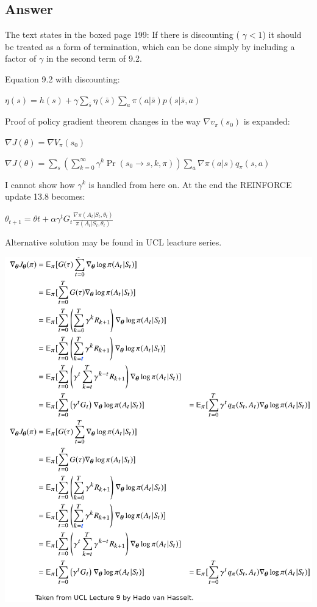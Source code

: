 \documentclass[11pt]{article}
\begin{document}
    \subsection*{Answer}

    \noindent The text states in the boxed page 199: If there is discounting ( $\gamma < 1 $) it should be treated as a form of termination, which can be done simply by including a factor of $\gamma$ in the second term of 9.2.

    \noindent Equation 9.2 with discounting:

    \noindent $ \eta(s) = h(s) + \gamma \sum_{\bar{s}} \eta(\bar{s}) \sum_{a} \pi(a|\bar{s}) p(s| \bar{s},a)  $

    \hfill \break
    \noindent Proof of policy gradient theorem changes in the way $ \nabla v_{\pi}(s_0) $ is expanded:

    \noindent $ \nabla J(\theta) = \nabla V_{\pi}(s_{0})  $

    \noindent $ \nabla J(\theta) = \sum_{s} ( \sum_{k=0}^{\infty} \gamma^{k} \Pr(s_0 \rightarrow s, k, \pi )  ) \sum_{a} \nabla \pi(a|s) q_\pi (s,a) $

    \hfill \break
    \noindent I cannot show how $ \gamma^k $ is handled from here on.
    At the end the REINFORCE update 13.8 becomes:

    \noindent $ \theta_{t+1} = \theta{t} + \alpha \gamma^t G_{t} \frac{\nabla\pi(A_t | S_t , \theta_t)}{\pi(A_t | S_t , \theta_t)} $

    \hfill \break
    \noindent Alternative solution may be found in UCL leacture series.

     \includegraphics[scale=0.3]{exercise_13_3}
\end{document}
